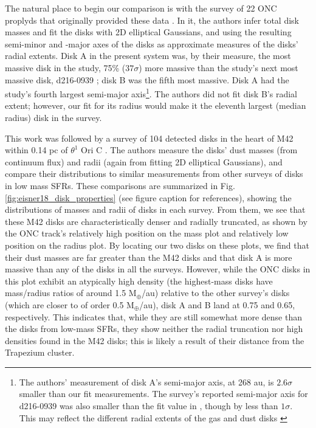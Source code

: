 The natural place to begin our comparison is with the survey of 22 ONC proplyds that originally provided these data \citep{Mann2014}. In it, the authors infer total disk masses and fit the disks with 2D elliptical Gaussians, and using the resulting semi-minor and -major axes of the disks as approximate measures of the disks' radial extents. Disk A in the present system was, by their measure, the most massive disk in the study, 75\% ($37\sigma$) more massive than the study's next most massive disk, d216-0939 \citep[the subject of][]{Factor2017} ; disk B was the fifth most massive. Disk A had the study's fourth largest semi-major axis\footnote{The authors' measurement of disk A's semi-major axis, at 268 au, is $2.6\sigma$ smaller than our fit measurements. The survey's reported semi-major axis for d216-0939 was also smaller than the fit value in \citet{Factor2017}, though by less than $1\sigma$. This may reflect the different radial extents of the gas and dust disks \citep[see][]{Hughes2008}}. The authors did not fit disk B's radial extent; however, our fit for its radius would make it the eleventh largest (median radius) disk in the survey.



This work was followed by a survey of 104 detected disks in the heart of M42 within 0.14 pc of $\theta^1$ Ori C \citep{Eisner2018}. The authors measure the disks' dust masses (from continuum flux) and radii (again from fitting 2D elliptical Gaussians), and compare their distributions to similar measurements from other surveys of disks in low mass SFRs. These comparisons are summarized in Fig. \ref{fig:eisner18_disk_properties} (see figure caption for references), showing the distributions of masses and radii of disks in each survey. From them, we see that these M42 disks are characteristically denser and radially truncated, as shown by the ONC track's relatively high position on the mass plot and relatively low position on the radius plot. By locating our two disks on these plots, we find that their dust masses are far greater than the M42 disks and that disk A is more massive than any of the disks in all the surveys. However, while the ONC disks in this plot exhibit an atypically high density (the highest-mass disks have mass/radius ratios of around 1.5 M$_\oplus$/au) relative to the other survey's disks (which are closer to of order 0.5 M$_\oplus$/au), disk A and B land at 0.75 and 0.65, respectively. This indicates that, while they are still somewhat more dense than the disks from low-mass SFRs, they show neither the radial truncation nor high densities found in the M42 disks; this is likely a result of their distance from the Trapezium cluster.


